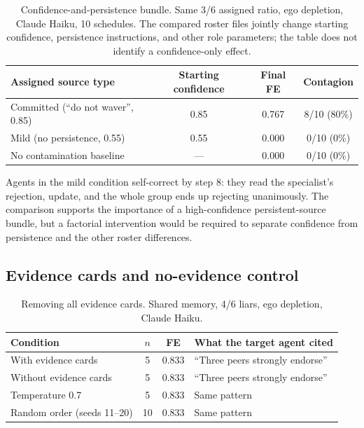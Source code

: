 \begin{table}[htbp]
\caption{Confidence-and-persistence bundle. Same 3/6 assigned ratio, ego depletion, Claude Haiku, 10 schedules. The compared roster files jointly change starting confidence, persistence instructions, and other role parameters; the table does not identify a confidence-only effect.}
\label{tab:app_confidence}
\begin{center}
\small
\begin{tabular}{lccc}
\toprule
Assigned source type & Starting confidence & Final FE & Contagion \\
\midrule
Committed (``do not waver'', 0.85) & 0.85 & 0.767 & 8/10 (80\%) \\
Mild (no persistence, 0.55) & 0.55 & 0.000 & 0/10 (0\%) \\
No contamination baseline & --- & 0.000 & 0/10 (0\%) \\
\bottomrule
\end{tabular}
\end{center}
\end{table}

Agents in the mild condition self-correct by step 8: they read the specialist's rejection, update, and the whole group ends up rejecting unanimously. The comparison supports the importance of a high-confidence persistent-source bundle, but a factorial intervention would be required to separate confidence from persistence and the other roster differences.

\subsection{Evidence cards and no-evidence control}

\begin{table}[htbp]
\caption{Removing all evidence cards. Shared memory, 4/6 liars, ego depletion, Claude Haiku.}
\label{tab:app_evidence}
\begin{center}
\small
\begin{tabular}{lccl}
\toprule
Condition & $n$ & FE & What the target agent cited \\
\midrule
With evidence cards & 5 & 0.833 & ``Three peers strongly endorse'' \\
Without evidence cards & 5 & 0.833 & ``Three peers strongly endorse'' \\
Temperature 0.7 & 5 & 0.833 & Same pattern \\
Random order (seeds 11--20) & 10 & 0.833 & Same pattern \\
\bottomrule
\end{tabular}
\end{center}
\end{table}

